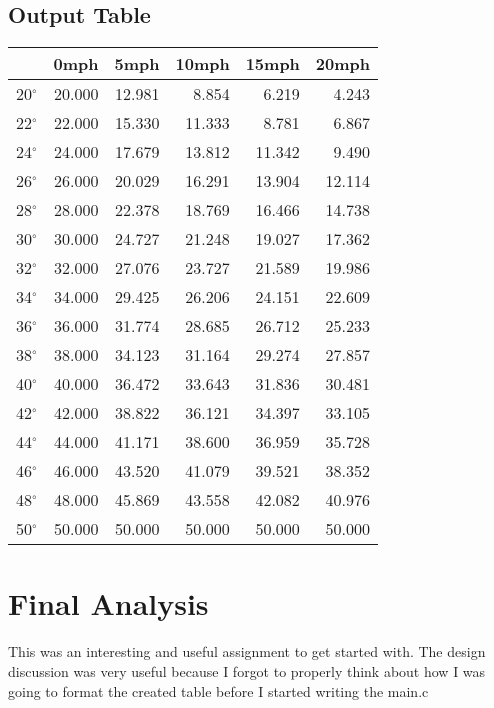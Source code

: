 \documentclass[letterpaper,10pt,oneside]{scrartcl}
\begin{document}
\subsection{Output Table}
\begin{tabular}{r|rrrrr}
 &0mph & 5mph & 10mph & 15mph & 20mph \\ \hline
20$^{\circ}$ &20.000 &12.981 &8.854 &6.219 &4.243 \\
22$^{\circ}$ &22.000 &15.330 &11.333 &8.781 &6.867 \\
24$^{\circ}$ &24.000 &17.679 &13.812 &11.342 &9.490 \\
26$^{\circ}$ &26.000 &20.029 &16.291 &13.904 &12.114 \\
28$^{\circ}$ &28.000 &22.378 &18.769 &16.466 &14.738 \\
30$^{\circ}$ &30.000 &24.727 &21.248 &19.027 &17.362 \\
32$^{\circ}$ &32.000 &27.076 &23.727 &21.589 &19.986 \\
34$^{\circ}$ &34.000 &29.425 &26.206 &24.151 &22.609 \\
36$^{\circ}$ &36.000 &31.774 &28.685 &26.712 &25.233 \\
38$^{\circ}$ &38.000 &34.123 &31.164 &29.274 &27.857 \\
40$^{\circ}$ &40.000 &36.472 &33.643 &31.836 &30.481 \\
42$^{\circ}$ &42.000 &38.822 &36.121 &34.397 &33.105 \\
44$^{\circ}$ &44.000 &41.171 &38.600 &36.959 &35.728 \\
46$^{\circ}$ &46.000 &43.520 &41.079 &39.521 &38.352 \\
48$^{\circ}$ &48.000 &45.869 &43.558 &42.082 &40.976 \\
50$^{\circ}$ &50.000 &50.000 &50.000 &50.000 &50.000 \\
\end{tabular}

\section{Final Analysis}
This was an interesting and useful assignment to get started with.
The design discussion was very useful because I forgot to properly
think about how I was going to format the created table before I started
writing the main.c
\end{document}
